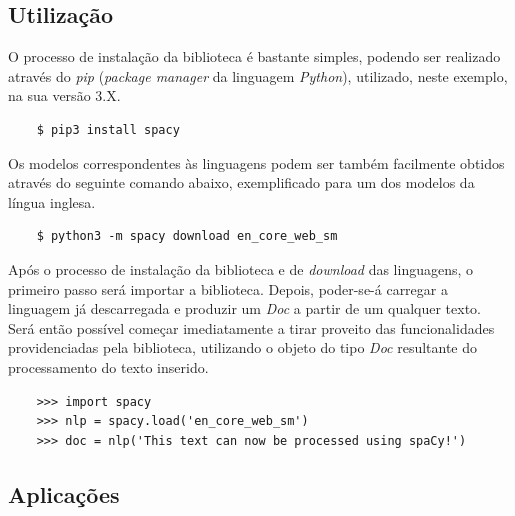 \documentclass[12pt]{article}
\begin{document}
\subsection{Utilização} %

O processo de instalação da biblioteca é bastante simples, podendo ser realizado através do \textit{pip} (\textit{package manager} da linguagem \textit{Python}), utilizado, neste
exemplo, na sua versão 3.X.

\begin{verbatim}
	$ pip3 install spacy
\end{verbatim}

Os modelos correspondentes às linguagens podem ser também facilmente obtidos através do seguinte comando abaixo, exemplificado para um dos modelos da língua inglesa.

\begin{verbatim}
	$ python3 -m spacy download en_core_web_sm
\end{verbatim}

Após o processo de instalação da biblioteca e de \textit{download} das linguagens, o primeiro passo será importar a biblioteca. Depois, poder-se-á carregar a linguagem já
descarregada e produzir um \textit{Doc} a partir de um qualquer texto. Será então possível começar imediatamente a tirar proveito das funcionalidades providenciadas pela biblioteca,
utilizando o objeto do tipo \textit{Doc} resultante do processamento do texto inserido.

\begin{verbatim}
	>>> import spacy
	>>> nlp = spacy.load('en_core_web_sm')
	>>> doc = nlp('This text can now be processed using spaCy!')
\end{verbatim}


\subsection{Aplicações}
\end{document}
